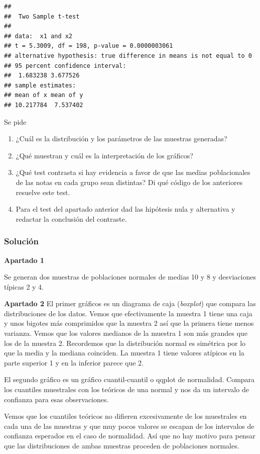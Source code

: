 \documentclass[
]{article}
\providecommand{\tightlist}{%
  \setlength{\itemsep}{0pt}\setlength{\parskip}{0pt}}
\begin{document}
\begin{verbatim}
## 
##  Two Sample t-test
## 
## data:  x1 and x2
## t = 5.3009, df = 198, p-value = 0.0000003061
## alternative hypothesis: true difference in means is not equal to 0
## 95 percent confidence interval:
##  1.683238 3.677526
## sample estimates:
## mean of x mean of y 
## 10.217784  7.537402
\end{verbatim}

Se pide

\begin{enumerate}
\def\labelenumi{\arabic{enumi}.}
\tightlist
\item
  ¿Cuál es la distribución y los parámetros de las muestras generadas?
\item
  ¿Qué muestran y cuál es la interpretación de los gráficos?
\item
  ¿Qué test contrasta si hay evidencia a favor de que las medias
  poblacionales de las notas en cada grupo sean distintas? Di qué código
  de los anteriores resuelve este test.
\item
  Para el test del apartado anterior dad las hipótesis nula y
  alternativa y redactar la conclusión del contraste.
\end{enumerate}

\hypertarget{soluciuxf3n-1}{%
\subsubsection{Solución}\label{soluciuxf3n-1}}

\textbf{Apartado 1}

Se generan dos muestras de poblaciones normales de medias 10 y 8 y
desviaciones típicas 2 y 4.

\textbf{Apartado 2} El primer gráficos es un diagrama de caja
(\emph{boxplot}) que compara las distribuciones de los datos. Vemos que
efectivamente la muestra 1 tiene una caja y unos bigotes más comprimidos
que la muestra 2 así que la primera tiene menos varianza. Vemos que los
valores medianos de la muestra 1 son más grandes que los de la muestra
2. Recordemos que la distribución normal es simétrica por lo que la
media y la mediana coinciden. La muestra 1 tiene valores atípicos en la
parte superior 1 y en la inferior parece que 2.

El segundo gráfico es un gráfico cuantil-cuantil o qqplot de normalidad.
Compara los cuantiles muestrales con los teóricos de una normal y nos da
un intervalo de confianza para esas observaciones.

Vemos que los cuantiles teóricos no difieren excesivamente de los
muestrales en cada una de las muestras y que muy pocos valores se
escapan de los intervalos de confianza esperados en el caso de
normalidad. Así que no hay motivo para pensar que las distribuciones de
ambas muestras proceden de poblaciones normales.
\end{document}
